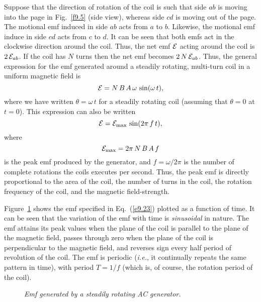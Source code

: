 Suppose that the direction of rotation of the coil is such that side
$ab$ is moving into the page in Fig.~\ref{f9.5} (side view), whereas side
$cd$ is moving out of the page. The motional emf induced in side $ab$ acts from 
$a$ to $b$. Likewise, the motional
emf induce in side $cd$ acts from $c$ to $d$. It can be seen that both emfs
act in the clockwise direction around the coil. Thus, the net emf 
${\cal E}$ acting around the
coil is $2\,{\cal E}_{ab}$. If the coil has $N$ turns then the net emf becomes
$2\,N\,{\cal E}_{ab}$. Thus, the general expression for the emf generated around a
steadily rotating, multi-turn coil in a uniform magnetic field is
\begin{equation}\label{e9.22}
{\cal E} = N\,B\,A\,\omega\,\sin( \omega\, t),
\end{equation}
where we have written $\theta = \omega \,t$ for a steadily rotating coil (assuming that
$\theta=0$ at $t=0$). This expression can also be written
\begin{equation}\label{e9.23}
{\cal E} = {\cal E}_{\rm max}\,\sin (2\pi\, f\, t),
\end{equation}
where 
\begin{equation}\label{e9.24}
{\cal E}_{\rm max}= 2\pi\,N\,B\,A\,f
\end{equation}
 is the peak emf produced by the generator, and
$f=\omega/2\pi$ is the number of complete rotations the coils executes per second. Thus, the
peak emf is directly proportional to the area of the coil, the number of turns
in the coil, the rotation frequency of the coil,
and the magnetic field-strength.

Figure~\ref{f9.6} shows the emf specified in Eq.~(\ref{e9.23}) plotted as a function
of time. It can be seen that the variation of the emf with time is
{\em sinusoidal}\/ in nature. The emf attains its peak values when the plane of
the coil is parallel to the plane of the magnetic field,  passes through
zero when the plane of the coil is perpendicular to the magnetic field, and reverses
sign every half period of revolution of the coil. The emf is periodic
({\em i.e.}, it continually repeats the same pattern in time), with
period $T= 1/f$ (which is, of course, the rotation period of the coil). 

\begin{figure}
\epsfysize=2.5in
\centerline{}
\caption{\em Emf generated by a steadily rotating AC generator.}\label{f9.6}
\end{figure}


